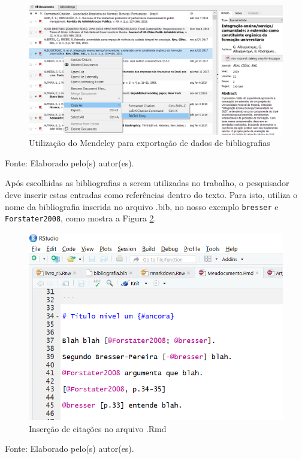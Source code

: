 \documentclass[12pt,brazil,oneside]{book}
\begin{document}
\begin{figure}[H]

{\centering \includegraphics[width=0.8\linewidth]{rmarkmendeley} 

}

\caption{Utilização do Mendeley para exportação de dados de bibliografias}\label{fig:rmarkmendeley}
\end{figure}

Fonte: Elaborado pelo(s) autor(es).

Após escolhidas as bibliografias a serem utilizadas no trabalho, o
pesquisador deve inserir estas entradas como referências dentro do
texto. Para isto, utiliza o nome da bibliografia inserida no arquivo
.bib, no nosso exemplo \texttt{bresser} e \texttt{Forstater2008}, como
mostra a Figura \ref{fig:rmarkcitar}.

\begin{figure}[H]

{\centering \includegraphics[width=0.8\linewidth]{rmarkcitar} 

}

\caption{Inserção de citações no arquivo .Rmd}\label{fig:rmarkcitar}
\end{figure}

Fonte: Elaborado pelo(s) autor(es).
\end{document}
